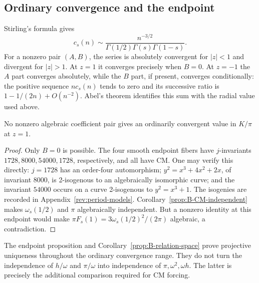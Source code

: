 \subsection{Ordinary convergence and the endpoint}\label{sec:endpoint}
Stirling's formula gives
\begin{equation}\label{eq:asymptotic}
 c_s(n)\sim
 \frac{n^{-3/2}}{\Gamma(1/2)\Gamma(s)\Gamma(1-s)}.
\end{equation}
For a nonzero pair $(A,B)$, the series is absolutely convergent for
$|z|<1$ and divergent for $|z|>1$. At $z=1$ it converges precisely
when $B=0$. At $z=-1$ the $A$ part converges absolutely, while the
$B$ part, if present, converges conditionally: the positive sequence
$nc_s(n)$ tends to zero and its successive ratio is
$1-1/(2n)+O(n^{-2})$. Abel's theorem identifies this sum with the
radial value used above.

\begin{proposition}
No nonzero algebraic coefficient pair gives an ordinarily convergent
value in $K/\pi$ at $z=1$.
\end{proposition}
\begin{proof}
Only $B=0$ is possible. The four smooth endpoint fibers have
$j$-invariants $1728,8000,54000,1728$, respectively, and all have
CM. One may verify this directly: $j=1728$ has an order-four
automorphism; $y^2=x^3+4x^2+2x$, of invariant $8000$, is
2-isogenous to an algebraically isomorphic curve; and the
invariant $54000$ occurs on a curve 2-isogenous to $y^2=x^3+1$.
The isogenies are recorded in Appendix~\ref{rev:period-models}.
Corollary~\ref{prop:B-CM-independent} makes $\omega_s(1/2)$ and
$\pi$ algebraically independent. But a nonzero identity at this
endpoint would make
$\pi F_s(1)=3\omega_s(1/2)^2/(2\pi)$ algebraic, a contradiction.
\end{proof}

The endpoint proposition and Corollary~\ref{prop:B-relation-space}
prove projective uniqueness throughout the ordinary convergence
range. They do not turn the independence of $h/\omega$ and
$\pi/\omega$ into independence of $\pi,\omega^2,\omega h$.
The latter is precisely the additional comparison required for CM
forcing.
